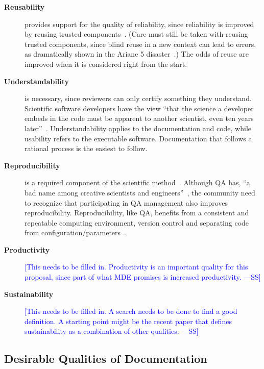 \documentclass[12pt]{article}
\newcommand{\authornote}[3]{\textcolor{#1}{[#3 ---#2]}}
\newcommand{\authornote}[3]{}
\newcommand{\wss}[1]{\authornote{blue}{SS}{#1}} %
\begin{document}
\begin{description}
\item [\textbf{Reusability}] provides support for the quality of reliability,
  since reliability is improved by reusing trusted components~\cite{Dubois2005}.
  (Care must still be taken with reusing trusted components, since blind reuse
  in a new context can lead to errors, as dramatically shown in the Ariane 5
  disaster~\cite[p.~37--38]{OliveiraAndStewart2006}.)  The odds of reuse are
  improved when it is considered right from the start.

\item [\textbf{Understandability}] is necessary, since reviewers can only certify
  something they understand.  Scientific software developers have the
  view ``that the science a developer embeds in the code must be apparent to
  another scientist, even ten years later''~\cite{Kelly2013}.
  Understandability applies to the documentation and code, while usability
  refers to the executable software.  Documentation that follows a rational
  process is the easiest to follow.

\item [\textbf{Reproducibility}] is a required component of the scientific
  method~\cite{Davison2012}.  Although QA has, ``a bad name among
  creative scientists and engineers''~\cite[p.~352]{Roache1998}, the community
  need to recognize that participating in QA management also improves
  reproducibility.  Reproducibility, like QA, benefits from a consistent and
  repeatable computing environment, version control and separating code from
  configuration/parameters~\cite{Davison2012}.

\item [\textbf{Productivity}] \wss{This needs to be filled in.  Productivity is
    an important quality for this proposal, since part of what MDE promises is
    increased productivity.}

\item [\textbf{Sustainability}] \wss{This needs to be filled in.  A search needs
    to be done to find a good definition.  A starting point might be the recent
    paper that defines sustainability as a combination of other qualities.}

\end{description}

\subsection{Desirable Qualities of Documentation} \label{SecDesirableQs}
\end{document}
